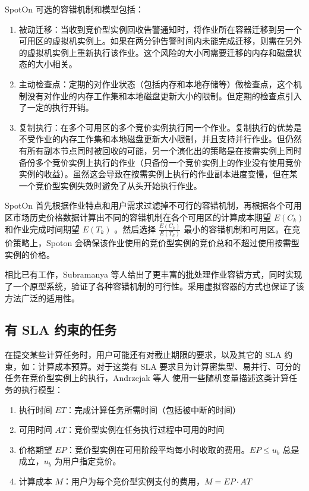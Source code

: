 SpotOn 可选的容错机制和模型包括：
\begin{enumerate}
\item 被动迁移：当收到竞价型实例回收告警通知时，将作业所在容器迁移到另一个可用区的虚拟机实例上。如果在两分钟告警时间内未能完成迁移，则需在另外的虚拟机实例上重新执行该作业。这个风险的大小同需要迁移的内存和磁盘状态的大小相关。
\item 主动检查点：定期的对作业状态（包括内存和本地存储等）做检查点，这个机制没有对作业的内存工作集和本地磁盘更新大小的限制。但定期的检查点引入了一定的执行开销。
\item 复制执行：在多个可用区的多个竞价实例执行同一个作业。复制执行的优势是不受作业的内存工作集和本地磁盘更新大小限制，并且支持并行作业。但仍然有所有副本节点同时被回收的可能，另一个演化出的策略是在按需实例上同时备份多个竞价实例上执行的作业（只备份一个竞价实例上的作业没有使用竞价实例的收益）。虽然这会导致在按需实例上执行的作业副本进度变慢，但在某一个竞价型实例失效时避免了从头开始执行作业。
\end{enumerate}

SpotOn 首先根据作业特点和用户需求过滤掉不可行的容错机制，再根据各个可用区市场历史价格数据计算出不同的容错机制在各个可用区的计算成本期望 $E(C_k)$ 和作业完成时间期望 $E(T_k)$ 。然后选择 $\frac{E(C_k)}{E(T_k)}$ 最小的容错机制和可用区。在竞价策略上，Spoton 会确保该作业使用的竞价型实例的竞价总和不超过使用按需型实例的价格。

相比已有工作，Subramanya 等人给出了更丰富的批处理作业容错方式，同时实现了一个原型系统，验证了各种容错机制的可行性。采用虚拟容器的方式也保证了该方法广泛的适用性。

\subsection{有 SLA 约束的任务}
在提交某些计算任务时，用户可能还有对截止期限的要求，以及其它的 SLA 约束，如：计算成本预算。对于这类有 SLA 要求且为计算密集型、易并行、可分的任务在竞价型实例上的执行，Andrzejak 等人 \cite{Andrzejak:2010:DMC:1906481.1906533} 使用一些随机变量描述这类计算任务的执行模型：
\begin{enumerate}
\item 执行时间 $ET$：完成计算任务所需时间（包括被中断的时间）
\item 可用时间 $AT$：竞价型实例在任务执行过程中可用的时间
\item 价格期望 $EP$：竞价型实例在可用阶段平均每小时收取的费用。$EP \leq u_b$ 总是成立，$u_b$ 为用户指定竞价。
\item 计算成本 $M$：用户为每个竞价型实例支付的费用，$M = EP \cdot AT$
\end{enumerate}

